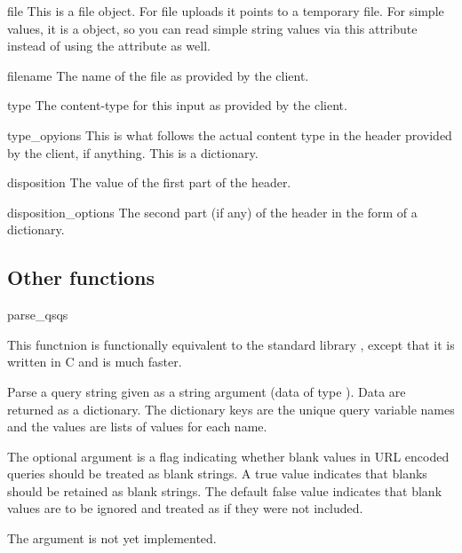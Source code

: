 \begin{memberdesc}{file}
This is a file object. For file uploads it points to a temporary file.
For simple values, it is a  object, so you can read
simple string values via this attribute instead of using the 
attribute as well.
\end{memberdesc}

\begin{memberdesc}{filename}
The name of the file as provided by the client.
\end{memberdesc}

\begin{memberdesc}{type}
The content-type for this input as provided by the client.
\end{memberdesc}

\begin{memberdesc}{type_opyions}
This is what follows the actual content type in the 
header provided by the client, if anything. This is a dictionary.
\end{memberdesc}

\begin{memberdesc}{disposition}
The value of the first part of the  header.
\end{memberdesc}

\begin{memberdesc}{disposition_options}
The second part (if any) of the  header in
the form of a dictionary.
\end{memberdesc}

\begin{seealso}
\end{seealso}

\subsection{Other functions\label{pyapi-util-funcs}}

\begin{funcdesc}{parse_qs}{qs}

This functnion is functionally equivalent to the standard library
 , except that it is written in C and is
much faster. 

Parse a query string given as a string argument (data of type
).  Data are
returned as a dictionary.  The dictionary keys are the unique query
variable names and the values are lists of values for each name.

The optional argument  is a flag indicating
whether blank values in URL encoded queries should be treated as blank
strings.  A true value indicates that blanks should be retained as
blank strings.  The default false value indicates that blank values
are to be ignored and treated as if they were not included.

 The  argument is not yet implemented.

\end{funcdesc}


